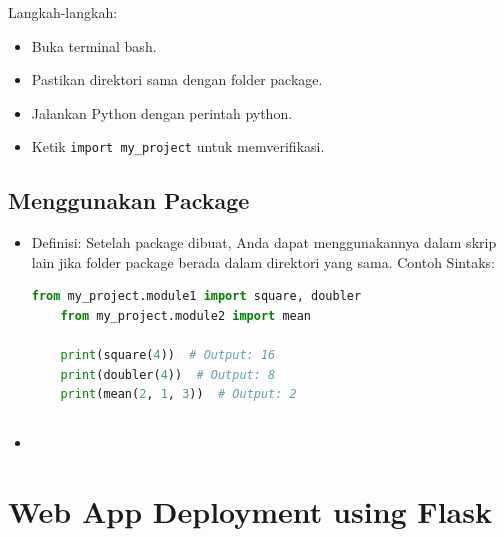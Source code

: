 \documentclass{article}
\begin{document}
Langkah-langkah:
\begin{itemize}
    \item Buka terminal bash.
    \item Pastikan direktori sama dengan folder package.
    \item Jalankan Python dengan perintah python.
    \item Ketik \verb|import my_project| untuk memverifikasi.
\end{itemize}

\subsection{Menggunakan Package}
\begin{itemize}
    \item Definisi: Setelah package dibuat, Anda dapat menggunakannya dalam skrip lain jika folder package berada dalam direktori yang sama. Contoh Sintaks:
          \begin{lstlisting}[language=Python, caption={}, captionpos=b]
    from my_project.module1 import square, doubler
    from my_project.module2 import mean
    
    print(square(4))  # Output: 16
    print(doubler(4))  # Output: 8
    print(mean(2, 1, 3))  # Output: 2
\end{lstlisting}
\end{itemize}

\subsection{}
\begin{itemize}
    \item
\end{itemize}

\newpage

\section{Web App Deployment using Flask}
\end{document}
